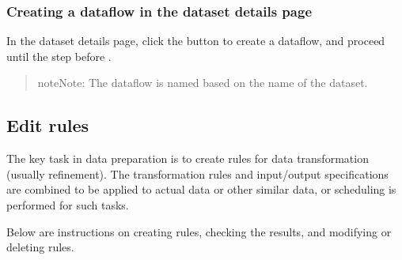 \documentclass[letterpaper,10pt,english]{sphinxmanual}
\begin{document}
\subsubsection{Creating a dataflow in the dataset details page}
\label{\detokenize{discovery/part07/add_datasets:dataflow-from-dataset}}\label{\detokenize{discovery/part07/add_datasets:id3}}
In the dataset details page, click the  button to create a dataflow, and proceed until the step before .
\begin{quote}

\begin{figure}[H]
\centering

\noindent{}
\end{figure}

\begin{sphinxadmonition}{note}{Note:}
The dataflow is named based on the name of the dataset.
\end{sphinxadmonition}
\end{quote}


\subsection{Edit rules}
\label{\detokenize{discovery/part07/edit_rules:id1}}\label{\detokenize{discovery/part07/edit_rules::doc}}
The key task in data preparation is to create rules for data transformation (usually refinement). The transformation rules and input/output specifications are combined to be applied to actual data or other similar data, or scheduling is performed for such tasks.

Below are instructions on creating rules, checking the results, and modifying or deleting rules.
\end{document}
